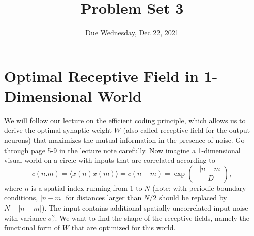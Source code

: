 \documentclass{article}
\title{Problem Set 3}
\date{Due Wednesday, Dec 22, 2021}
\begin{document}
\maketitle

\section*{Optimal Receptive Field in 1-Dimensional World}
We will follow our lecture on the efficient coding principle, which allows us to derive the optimal synaptic weight $W$ (also called receptive field for the output neurons) that maximizes the mutual information in the presence of noise. Go through page 5-9 in the lecture note carefully. Now imagine a 1-dimensional visual world on a circle with inputs that are correlated according to 
\begin{equation}
c(n.m) = \langle x(n)x(m)\rangle = c(n-m) = \exp(-\frac{|n-m|}{D}), 
\end{equation}
where $n$ is a spatial index running from 1 to $N$ (note: with periodic boundary conditions, $|n-m|$ for distances larger than $N/2$ should be replaced by $N-|n-m|$). The input contains additional spatially uncorrelated input noise with variance $\sigma_z^2$.  We want to find the shape of the receptive fields, namely the functional form of $W$ that are optimized for this world.
\end{document}
